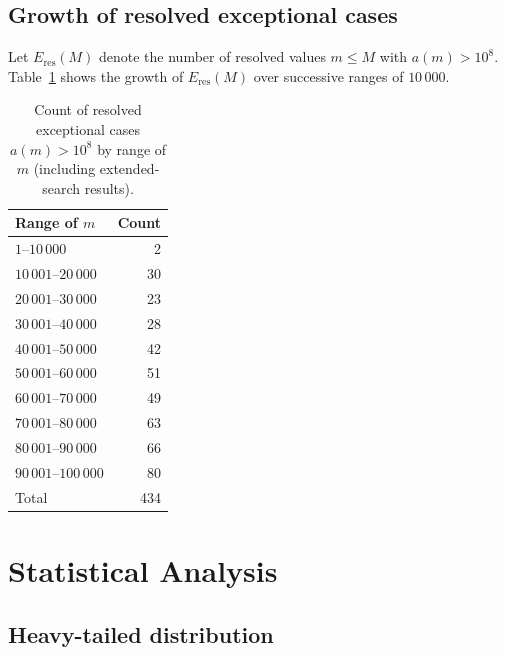 \documentclass[12pt]{article}
\begin{document}
	\subsection{Growth of resolved exceptional cases}
	
	Let $E_{\mathrm{res}}(M)$ denote the number of resolved values
	$m \leq M$ with $a(m) > 10^8$.
	Table~\ref{tab:growth} shows the growth of $E_{\mathrm{res}}(M)$ over
	successive ranges of $10\,000$.
	
	\begin{table}[ht]
		\centering
		\caption{Count of resolved exceptional cases $a(m) > 10^8$
			by range of $m$ (including extended-search results).}
		\label{tab:growth}
		\begin{tabular}{lr}
			\toprule
			Range of $m$ & Count \\
			\midrule
			$1$--$10\,000$   &   2 \\
			$10\,001$--$20\,000$ &  30 \\
			$20\,001$--$30\,000$ &  23 \\
			$30\,001$--$40\,000$ &  28 \\
			$40\,001$--$50\,000$ &  42 \\
			$50\,001$--$60\,000$ &  51 \\
			$60\,001$--$70\,000$ &  49 \\
			$70\,001$--$80\,000$ &  63 \\
			$80\,001$--$90\,000$ &  66 \\
			$90\,001$--$100\,000$ &  80 \\
			\midrule
			Total & 434 \\
			\bottomrule
		\end{tabular}
	\end{table}
	
	\section{Statistical Analysis}
	
	\subsection{Heavy-tailed distribution}
	
\end{document}
